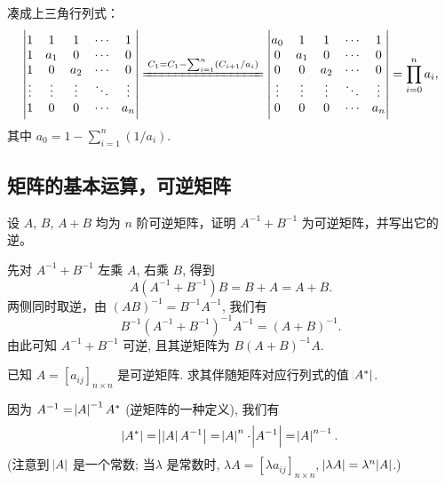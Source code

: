 \begin{solution}
    凑成上三角行列式：
    \[
    \begin{vmatrix}
    1 & 1 & 1 & \cdots & 1 \\
    1 & a_1 & 0 & \cdots & 0 \\
    1 & 0 & a_2 & \cdots & 0 \\
    \vdots & \vdots & \vdots & \ddots & \vdots \\
    1 & 0 & 0 & \cdots & a_n \\
    \end{vmatrix} \xlongequal{C_1 = C_1 - \sum_{i=1}^{n} (C_{i+1} / a_i)}
    \begin{vmatrix}
    a_0 & 1 & 1 & \cdots & 1 \\
    0 & a_1 & 0 & \cdots & 0 \\
    0 & 0 & a_2 & \cdots & 0 \\
    \vdots & \vdots & \vdots & \ddots & \vdots \\
    0 & 0 & 0 & \cdots & a_n \\
    \end{vmatrix} = \prod_{i=0}^{n} a_i,
    \]
    其中 $a_0 = 1 - \sum_{i=1}^{n} (1/a_i)$.
\end{solution}

\subsection{矩阵的基本运算，可逆矩阵}

\begin{exercise}
    设 $A$, $B$, $A + B$ 均为 $n$ 阶可逆矩阵，证明 $A^{-1} + B^{-1}$ 为可逆矩阵，并写出它的逆。
\end{exercise}

\begin{solution}
    先对 $A^{-1} + B^{-1}$ 左乘 $A$, 右乘 $B$, 得到
    \[
        A(A^{-1} + B^{-1})B = B + A = A + B.
    \]
    两侧同时取逆，由 $(AB)^{-1} = B^{-1} A^{-1}$, 我们有
    \[
        B^{-1} (A^{-1} + B^{-1})^{-1} A^{-1}  = (A + B)^{-1}.
    \]
    由此可知 $A^{-1} + B^{-1}$ 可逆, 且其逆矩阵为 $B (A + B)^{-1} A$.
\end{solution}

\begin{exercise}
	已知 $A = [a_{ij}]_{n \times n}$ 是可逆矩阵. 求其伴随矩阵对应行列式的值 $\abs{A^*}$.
\end{exercise}
\begin{solution}
	因为 $A^{-1} = \abs{A}^{-1} A^*$ (逆矩阵的一种定义), 我们有
    \[
        \abs{A^*} 
        = \abs[1]{\, \abs{A} A^{-1} } 
        = \abs{A}^n \cdot \abs{A^{-1}} 
        = \abs{A}^{n-1}.
    \]
    (注意到 $\abs{A}$ 是一个常数; 当$\lambda$ 是常数时, $\lambda A = [\lambda a_{ij}]_{n \times n}$, $\abs{\lambda A} = \lambda^n \abs{A}$.)
\end{solution}

